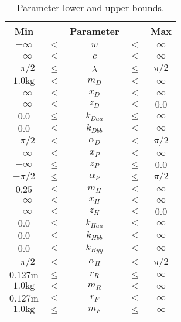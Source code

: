 \documentclass{bmd2019a}
\begin{document}
\begin{table}
  \caption{Parameter lower and upper bounds.}
  \label{tab:bounds}
  \centering
  \begin{tabular}{ccccc}
    \toprule
    Min & & Parameter & & Max\\
    \midrule
    $-\infty$ & $\leq$ & $w       $  &  $\leq$  &  $\infty$ \\
    $-\infty$ & $\leq$ & $c       $  &  $\leq$  &  $\infty$ \\
    $-\pi/2 $ & $\leq$ & $\lambda $  &  $\leq$  &  $\pi/2$ \\
    $1.0\si{\kilogram}$ & $\leq$ & $m_D     $  &  $\leq$  &  $\infty$ \\
    $-\infty$ & $\leq$ & $x_D     $  &  $\leq$  &  $\infty$ \\
    $-\infty$ & $\leq$ & $z_D     $  &  $\leq$  &  $0.0$    \\
    $0.0    $ & $\leq$ & $k_{Daa} $  &  $\leq$  &  $\infty$ \\
    $0.0    $ & $\leq$ & $k_{Dbb} $  &  $\leq$  &  $\infty$ \\
    $-\pi/2 $ & $\leq$ & $\alpha_D$  &  $\leq$  &  $\pi/2$  \\
    $-\infty$ & $\leq$ & $x_P     $  &  $\leq$  &  $\infty$ \\
    $-\infty$ & $\leq$ & $z_P     $  &  $\leq$  &  $0.0$    \\
    $-\pi/2 $ & $\leq$ & $\alpha_P$  &  $\leq$  &  $\pi/2$ \\
    $0.25   $ & $\leq$ & $m_H     $  &  $\leq$  &  $\infty$ \\
    $-\infty$ & $\leq$ & $x_H     $  &  $\leq$  &  $\infty$ \\
    $-\infty$ & $\leq$ & $z_H     $  &  $\leq$  &  $0.0$ \\
    $0.0    $ & $\leq$ & $k_{Haa} $  &  $\leq$  &  $\infty$ \\
    $0.0    $ & $\leq$ & $k_{Hbb} $  &  $\leq$  &  $\infty$ \\
    $0.0    $ & $\leq$ & $k_{Hyy} $  &  $\leq$  &  $\infty$ \\
    $-\pi/2 $ & $\leq$ & $\alpha_H$  &  $\leq$  &  $\pi/2$ \\
    $0.127\si{\meter}$ & $\leq$ & $r_R     $  &  $\leq$  &  $\infty$ \\
    $1.0\si{\kilogram}$ & $\leq$ & $m_R     $  &  $\leq$  &  $\infty$ \\
    $0.127\si{\meter}$ & $\leq$ & $r_F     $  &  $\leq$  &  $\infty$ \\
    $1.0\si{\kilogram}$ & $\leq$ & $m_F     $  &  $\leq$  &  $\infty$ \\
    \bottomrule
  \end{tabular}
\end{table}
\end{document}
